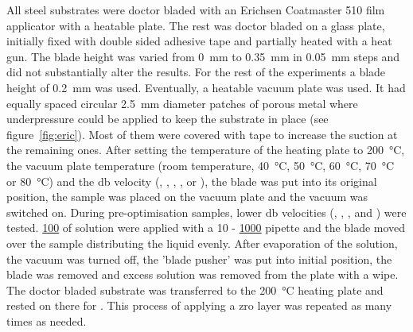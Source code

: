 All steel substrates 
were doctor bladed with 
an Erichsen Coatmaster 510 film applicator with a heatable plate.
The rest was doctor bladed on a glass plate, initially fixed with double sided adhesive tape and 
partially heated with a heat gun.
The blade height was varied from \SI{0}{\milli\meter} to \SI{0.35}{\milli\meter} in 
\SI{0.05}{\milli\meter} steps and did not substantially alter the results.
For the rest of the experiments a blade height of \SI{0.2}{\milli\meter} was used.
%
Eventually, a heatable vacuum plate was used. It 
had equally spaced circular \SI{2.5}{\milli\meter} diameter patches of porous metal where 
underpressure could be applied to keep the substrate in place (see 
figure~\ref{fig:eric}). 
Most of them were covered with tape to increase the suction at the remaining ones. 
After setting the temperature of the heating plate to 
\SI{200}{\celsius}, the vacuum plate temperature (room temperature, \SI{40}{\celsius}, 
\SI{50}{\celsius}, \SI{60}{\celsius}, \SI{70}{\celsius} or \SI{80}{\celsius}) and the 
\gls{db} velocity (, , , ,  or ), 
the blade was put into its original position, the sample was placed on the vacuum plate and the vacuum 
was switched on. 
During pre-optimisation samples, lower \gls{db} velocities (, , 
,  and ) were tested. 
\ul{100} of solution were 
applied with a 10 - \ul{1000} pipette and the blade moved over the sample distributing the 
liquid evenly. After evaporation of the solution, the vacuum was turned off, the 'blade 
pusher' was put into initial position, the blade was removed and excess solution 
was removed from the plate with a wipe. 
The doctor bladed substrate was transferred to the \SI{200}{\celsius} heating plate and 
rested on there for . 
This process of applying a \gls{zro} layer was repeated as many times as needed.
